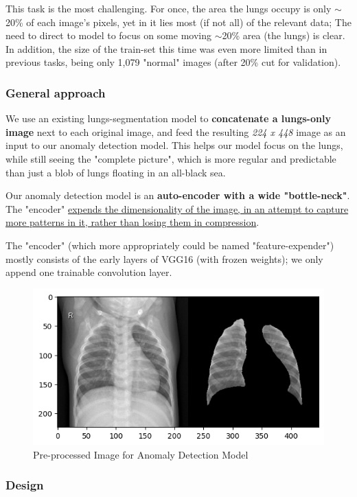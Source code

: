 \documentclass{article}
\begin{document}
This task is the most challenging. For once, the area the lungs occupy is only $\sim$20\% of each image's pixels, yet in it lies most (if not all) of the relevant data; The need to direct to model to focus on some moving $\sim$20\% area (the lungs) is clear. In addition, the size of the train-set this time was even more limited than in previous tasks, being only 1,079 "normal" images (after 20\% cut for validation).

\subsubsection{General approach}
We use an existing lungs-segmentation model to \textbf{concatenate a lungs-only image} next to each original image, and feed the resulting \textit{224 x 448} image as an input to our anomaly detection model. This helps our model focus on the lungs, while still seeing the "complete picture", which is more regular and predictable than just a blob of lungs floating in an all-black sea.

Our anomaly detection model is an \textbf{auto-encoder with a wide "bottle-neck"}. The "encoder" \uline{expends the dimensionality of the image, in an attempt to capture more patterns in it, rather than losing them in compression}.

The "encoder" (which more appropriately could be named "feature-expender") mostly consists of the early layers of VGG16 (with frozen weights); we only append one trainable convolution layer.

\begin{figure}[H]
  \centering
  \includegraphics[width=0.8\linewidth]{concatenated-lungs-segmentation.png}
  \caption{Pre-processed Image for Anomaly Detection Model}
  \label{fig:concatenated-lungs-segmentation}
\end{figure}

\subsubsection{Design}
\end{document}
